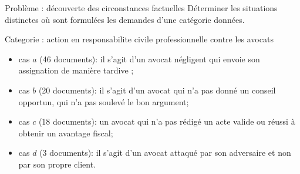 \begin{frame}[c]{Problème : découverte des circonstances factuelles}
  Déterminer les situations distinctes où sont formulées les demandes d'une catégorie données.
    \begin{exampleblock}{Categorie : action en responsabilite civile professionnelle contre les avocats}
	\begin{itemize}
    \item cas $a$ (46 documents): il s'agit d'un avocat négligent qui envoie son assignation de manière tardive ; %
    \item cas $b$ (20 documents): il s'agit d'un avocat qui n'a pas donné un conseil opportun, qui n'a pas soulevé le bon argument;
    \item cas $c$ (18 documents): un avocat qui n'a pas rédigé un acte valide ou réussi à obtenir un avantage fiscal; %
    \item cas $d$ (3 documents): il s'agit d'un avocat attaqué par son adversaire et non par son propre client.
    \end{itemize}
    \end{exampleblock}
\end{frame}